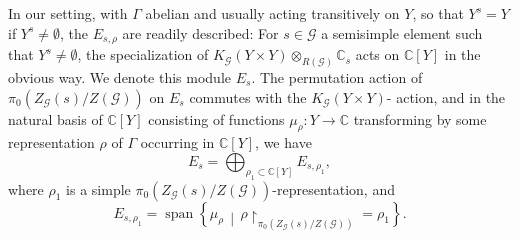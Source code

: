 \documentclass[10pt]{article}
\DeclareMathOperator{\spn}{span}
\newcommand{\Restriction}{\upharpoonright}
\newcommand{\sets}[2]{\left\{#1\,\middle|\,#2\right\}}
\newcommand{\C}{\mathbb{C}}
\theoremstyle{definition}
\theoremstyle{remark}
\newcommand{\Zz}{\mathcal{G}}
\begin{document}
In our setting, with $\Gamma$ abelian and usually acting transitively on $Y$, so that
$Y^s=Y$ if $Y^s\neq \emptyset$, the $E_{s,\rho}$ are readily described: For 
$s\in\Zz$ a semisimple element such that $Y^s\neq\emptyset$, the specialization of 
$K_\Zz(Y\times Y)\otimes_{R(\Zz)}\C_s$ acts on $\C[Y]$ in the obvious way. We denote this module $E_s$. 
The permutation action of $\pi_0(Z_{\Zz}(s)/Z(\Zz))$ on $E_s$ commutes with the $K_{\Zz}(Y\times Y)$-
action, and in the natural basis of $\C[Y]$ consisting of functions $\mu_\rho\colon Y\to \C$ transforming 
by some representation $\rho$ of $\Gamma$ occurring in $\C[Y]$, we have 
%
\[
E_s=\bigoplus_{\rho_1\subset\C[Y]}E_{s,\rho_1},
\]
%
where $\rho_1$ is a simple $\pi_0(Z_{\Zz}(s)/Z(\Zz))$-representation, and
%
\[
E_{s,\rho_1}=\spn{\sets{\mu_{\rho}}{\rho\Restriction_{\pi_0(Z_{\Zz}(s)/Z(\Zz))}=\rho_1}}.
\]
%
\end{document}
